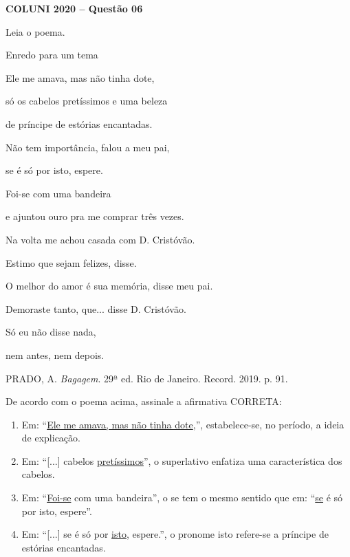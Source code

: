 \textbf{COLUNI 2020 -- Questão 06}\par\medskip Leia o poema.

\par

Enredo para um tema

\par

Ele me amava, mas não tinha dote,

só os cabelos pretíssimos e uma beleza

de príncipe de estórias encantadas.

Não tem importância, falou a meu pai,

se é só por isto, espere.

Foi-se com uma bandeira

e ajuntou ouro pra me comprar três vezes.

Na volta me achou casada com D. Cristóvão.

Estimo que sejam felizes, disse.

O melhor do amor é sua memória, disse meu pai.

Demoraste tanto, que... disse D. Cristóvão.

Só eu não disse nada,

nem antes, nem depois.

\par

PRADO, A. \textit{Bagagem}. 29ª ed. Rio de Janeiro. Record. 2019. p. 91.

\par

De acordo com o poema acima, assinale a afirmativa CORRETA:
\begin{enumerate}
\item Em: “\underline{Ele me amava, mas não tinha dote},”, estabelece-se, no período, a ideia de explicação.
\item Em: “[...] cabelos \underline{pretíssimos}”, o superlativo enfatiza uma característica dos cabelos.
\item Em: “\underline{Foi-se} com uma bandeira”, o se tem o mesmo sentido que em: “\underline{se} é só por isto, espere”.
\item Em: “[...] se é só por \underline{isto}, espere.”, o pronome isto refere-se a príncipe de estórias encantadas.
\end{enumerate}
